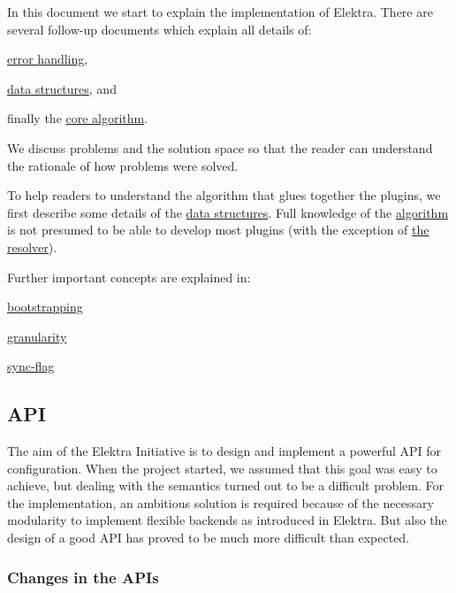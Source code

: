 In this document we start to explain the implementation of Elektra. There are several follow-\/up documents which explain all details of\+:


\begin{DoxyItemize}
\item \hyperlink{doc_dev_error-handling_md}{error handling},
\item \hyperlink{doc_dev_data-structures_md}{data structures}, and
\item finally the \hyperlink{doc_dev_algorithm_md}{core algorithm}.
\end{DoxyItemize}

We discuss problems and the solution space so that the reader can understand the rationale of how problems were solved.

To help readers to understand the algorithm that glues together the plugins, we first describe some details of the \hyperlink{doc_dev_data-structures_md}{data structures}. Full knowledge of the \hyperlink{doc_dev_algorithm_md}{algorithm} is not presumed to be able to develop most plugins (with the exception of \hyperlink{md_src_plugins_resolver_README_src_plugins_resolver_README_md}{the resolver}).

Further important concepts are explained in\+:


\begin{DoxyItemize}
\item \hyperlink{doc_help_elektra-bootstrapping_md}{bootstrapping}
\item \hyperlink{doc_help_elektra-granularity_md}{granularity}
\item \hyperlink{doc_help_elektra-sync-flag_md}{sync-\/flag}
\end{DoxyItemize}

\subsection*{A\+PI}

The aim of the Elektra Initiative is to design and implement a powerful A\+PI for configuration. When the project started, we assumed that this goal was easy to achieve, but dealing with the semantics turned out to be a difficult problem. For the implementation, an ambitious solution is required because of the necessary modularity to implement flexible backends as introduced in Elektra. But also the design of a good A\+PI has proved to be much more difficult than expected.

\subsubsection*{Changes in the A\+P\+Is}

